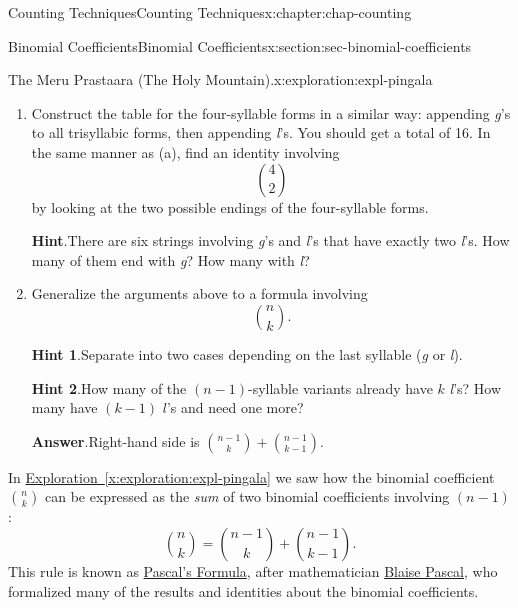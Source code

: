 \documentclass[oneside,10pt,]{book}
\newcommand{\blocktitlefont}{\relax}
\newcommand{\xreffont}{\relax}
\numberwithin{equation}{section}
\begin{document}
\begin{chapterptx}{Counting Techniques}{}{Counting Techniques}{}{}{x:chapter:chap-counting}
\begin{sectionptx}{Binomial Coefficients}{}{Binomial Coefficients}{}{}{x:section:sec-binomial-coefficients}
\begin{exploration}{The Meru Prastaara (The Holy Mountain).}{x:exploration:expl-pingala}
\begin{enumerate}[font=\bfseries,label=(\alph*),ref=\alph*]
\begin{equation*}
\binom{3}{2} = \binom{2}{2} + \binom{2}{1}\text{.}
\end{equation*}
%
\item{}Construct the table for the four-syllable forms in a similar way: appending \emph{g}'s to all trisyllabic forms, then appending \emph{l}'s. You should get a total of 16. In the same manner as (a), find an identity involving%
\begin{equation*}
\displaystyle\binom{4}{2}
\end{equation*}
by looking at the two possible endings of the four-syllable forms.%
\par\smallskip%
\noindent\textbf{\blocktitlefont Hint}.\hypertarget{g:hint:id461781}{}\quad{}There are six strings involving \emph{g}'s and \emph{l}'s that have exactly two \emph{l}'s. How many of them end with \emph{g}? How many with \emph{l}?%
\item{}Generalize the arguments above to a formula involving%
\begin{equation*}
\binom{n}{k}\text{.}
\end{equation*}
%
\par\smallskip%
\noindent\textbf{\blocktitlefont Hint 1}.\hypertarget{g:hint:id461789}{}\quad{}Separate into two cases depending on the last syllable (\emph{g} or \emph{l}).%
\par\smallskip%
\noindent\textbf{\blocktitlefont Hint 2}.\hypertarget{g:hint:id461823}{}\quad{}How many of the \((n-1)\)-syllable variants already have \(k\) \emph{l}'s? How many have \((k-1)\) \(l\)'s and need one more?%
\par\smallskip%
\noindent\textbf{\blocktitlefont Answer}.\hypertarget{g:answer:id461828}{}\quad{}Right-hand side is \(\displaystyle\binom{n-1}{k} + \binom{n-1}{k-1}\).%
\end{enumerate}
\end{exploration}
In \hyperref[x:exploration:expl-pingala]{Exploration~{\xreffont\ref{x:exploration:expl-pingala}}} we saw how the binomial coefficient \(\displaystyle\binom{n}{k}\) can be expressed as the \emph{sum} of two binomial coefficients involving \((n-1)\):%
\begin{equation*}
\binom{n}{k} = \binom{n-1}{k} + \binom{n-1}{k-1}\text{.}
\end{equation*}
This rule is known as \href{https://en.wikipedia.org/wiki/Pascal\%27s_rule}{Pascal's Formula}, after mathematician \href{https://en.wikipedia.org/wiki/Blaise_Pascal}{Blaise Pascal}, who formalized many of the results and identities about the binomial coefficients.%

\end{sectionptx}
\end{chapterptx}
\end{document}
